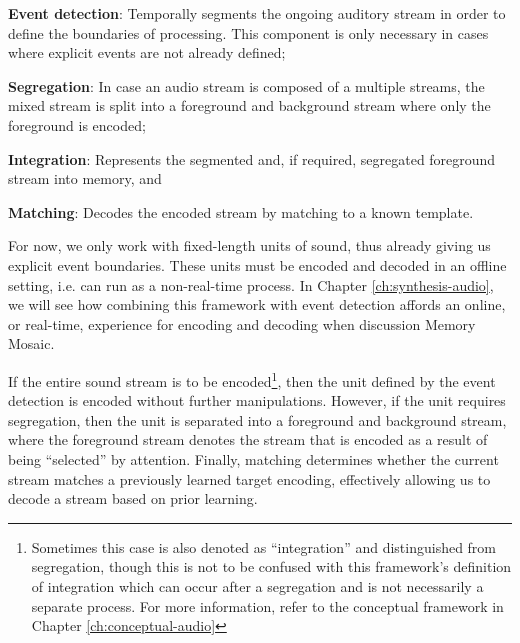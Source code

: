 \documentclass[a4paper,10pt,final]{ThesisStyle}
\begin{document}
\begin{enumerateb}
\item \textbf{Event detection}: Temporally segments the ongoing auditory stream in order to define the boundaries of processing.  This component is only necessary in cases where explicit events are not already defined; 
\item \textbf{Segregation}: In case an audio stream is composed of a multiple streams, the mixed stream is split into a foreground and background stream where only the foreground is encoded; 
\item \textbf{Integration}: Represents the segmented and, if required, segregated foreground stream into memory, and 
\item \textbf{Matching}: Decodes the encoded stream by matching to a known template.
\end{enumerateb}

For now, we only work with fixed-length units of sound, thus already giving us explicit event boundaries.  These units must be encoded and decoded in an offline setting, i.e. can run as a non-real-time process.  In Chapter \ref{ch:synthesis-audio}, we will see how combining this framework with event detection affords an online, or real-time, experience for encoding and decoding when discussion Memory Mosaic.

If the entire sound stream is to be encoded\footnote{Sometimes this case is also denoted as ``integration'' and distinguished from segregation, though this is not to be confused with this framework's definition of integration which can occur after a segregation and is not necessarily a separate process.  For more information, refer to the conceptual framework in Chapter \ref{ch:conceptual-audio}}, then the unit defined by the event detection is encoded without further manipulations. However, if the unit requires segregation, then the unit is separated into a foreground and background stream, where the foreground stream denotes the stream that is encoded as a result of being ``selected'' by attention.  Finally, matching determines whether the current stream matches a previously learned target encoding, effectively allowing us to decode a stream based on prior learning.
\end{document}

